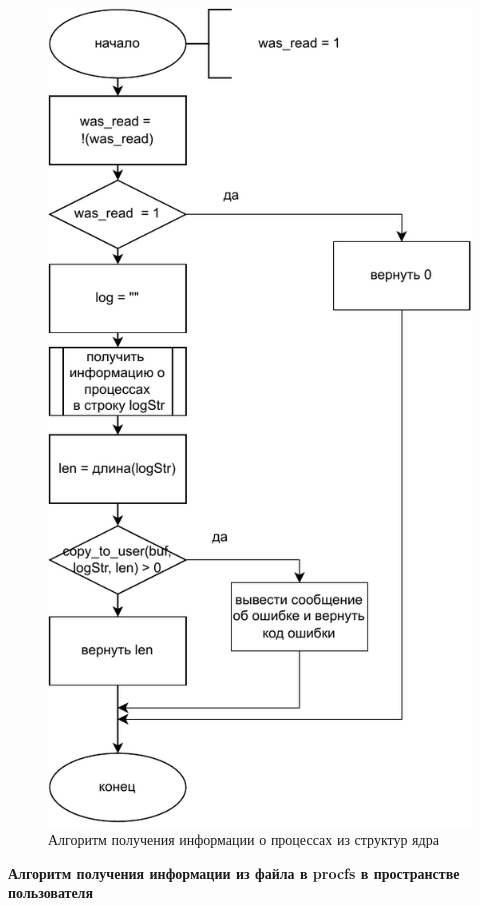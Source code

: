 \begin{figure}[H]
	\centering
	\includegraphics[scale=1]{img/os-l2.pdf}
	\caption{Алгоритм получения информации о процессах из структур ядра}
	\label{fig:read}
\end{figure}

\textbf{Алгоритм получения информации из файла в procfs в пространстве пользователя}

